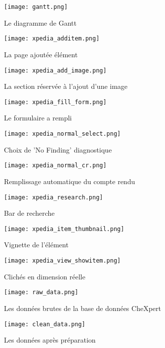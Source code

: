 \begin{figure}[H]
    \centering
    \texttt{[image: gantt.png]}
    \caption{Le diagramme de Gantt}\label{fig:gantt}
\end{figure}


\begin{figure}[H]
    \centering
    \texttt{[image: xpedia\_additem.png]}
    \caption{La page ajoutée élément}\label{fig:xpedia_additem}
\end{figure}
\begin{figure}[H]
    \centering
    \texttt{[image: xpedia\_add\_image.png]}
    \caption{La section réservée à l’ajout d’une image}\label{fig:xpedia_add_image}
\end{figure}
\begin{figure}[H]
    \centering
    \texttt{[image: xpedia\_fill\_form.png]}
    \caption{Le formulaire a rempli}\label{fig:xpedia_fill_form}
\end{figure}
\begin{figure}[H]
    \centering
    \texttt{[image: xpedia\_normal\_select.png]}
    \caption{Choix de ’No Finding’ diagnostique}\label{fig:nofinding_choice}
\end{figure}
\begin{figure}[H]
    \centering
    \texttt{[image: xpedia\_normal\_cr.png]}
    \caption{Remplissage automatique du compte rendu}\label{fig:xpedia_normal_cr}
\end{figure}
\begin{figure}[H]
    \centering
    \texttt{[image: xpedia\_research.png]}
    \caption{Bar de recherche }\label{fig:xpedia_research}
\end{figure}

\begin{figure}[H]
    \centering
    \texttt{[image: xpedia\_item\_thumbnail.png]}
    \caption{Vignette de l'élément}\label{fig:xpedia_item_thumbnail}
\end{figure}
\begin{figure}[H]
    \centering
    \texttt{[image: xpedia\_view\_showitem.png]}
    \caption{Clichés en dimension réelle}\label{fig:xpedia_view_showitem}
\end{figure}
\begin{figure}[H]
    \centering
    \texttt{[image: raw\_data.png]}
    \caption{Les données brutes de la base de données CheXpert}\label{fig:raw_data}
\end{figure}
\begin{figure}[H]
    \centering
    \texttt{[image: clean\_data.png]}
    \caption{Les données après préparation}\label{fig:clean_data}
\end{figure}

